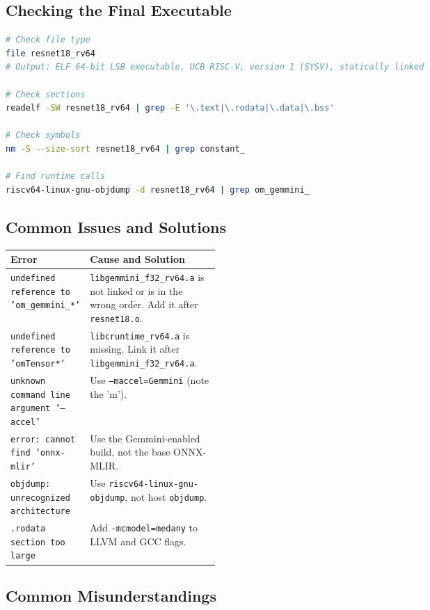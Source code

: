\documentclass[12pt,a4paper]{article}
\begin{document}
\subsection{Checking the Final Executable}

\begin{lstlisting}[language=bash, caption=Basic Verification Commands]
# Check file type
file resnet18_rv64
# Output: ELF 64-bit LSB executable, UCB RISC-V, version 1 (SYSV), statically linked

# Check sections
readelf -SW resnet18_rv64 | grep -E '\.text|\.rodata|\.data|\.bss'

# Check symbols
nm -S --size-sort resnet18_rv64 | grep constant_

# Find runtime calls
riscv64-linux-gnu-objdump -d resnet18_rv64 | grep om_gemmini_
\end{lstlisting}

\subsection{Common Issues and Solutions}

\begin{table}[H]
\centering
\small
\begin{tabularx}{\linewidth}{@{}L{0.35\linewidth}Y@{}}
\toprule
\textbf{Error} & \textbf{Cause and Solution} \\
\midrule
\texttt{undefined reference to 'om\_gemmini\_*'} & \texttt{libgemmini\_f32\_rv64.a} is not linked or is in the wrong order. Add it after \texttt{resnet18.o}. \\
\texttt{undefined reference to 'omTensor*'} & \texttt{libcruntime\_rv64.a} is missing. Link it after \texttt{libgemmini\_f32\_rv64.a}. \\
\texttt{unknown command line argument '--accel'} & Use \texttt{--maccel=Gemmini} (note the 'm'). \\
\texttt{error: cannot find 'onnx-mlir'} & Use the Gemmini-enabled build, not the base ONNX-MLIR. \\
\texttt{objdump: unrecognized architecture} & Use \texttt{riscv64-linux-gnu-objdump}, not host \texttt{objdump}. \\
\texttt{.rodata section too large} & Add \texttt{-mcmodel=medany} to LLVM and GCC flags. \\
\bottomrule
\end{tabularx}
\end{table}

\subsection{Common Misunderstandings}
\end{document}
